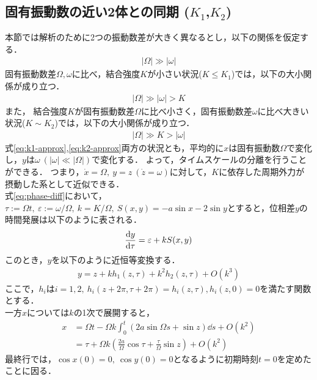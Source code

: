 \documentclass[../main]{subfiles}
\begin{document}
    \subsection{固有振動数の近い2体との同期 ($K_1$,$K_2$)}
    \label{sec:3body-k12}
    本節では解析のために2つの振動数差が大きく異なるとし，以下の関係を仮定する．
    \begin{align}
        \label{eq:assume}
        |\Omega|\gg|\omega|
    \end{align}
    固有振動数差$\Omega,\omega$に比べ，結合強度$K$が小さい状況($K\leq K_1$)では，以下の大小関係が成り立つ．
    \begin{align}
        \label{eq:k1-approx}
        |\Omega|\gg|\omega|>K
    \end{align}
    また，
    結合強度$K$が固有振動数差$\Omega$に比べ小さく，固有振動数差$\omega$に比べ大きい状況($K\sim K_2$)では，以下の大小関係が成り立つ．
    \begin{align}
        \label{eq:k2-approx}
        |\Omega|\gg K>|\omega|
    \end{align}
    式\eqref{eq:k1-approx},\eqref{eq:k2-approx}両方の状況とも，平均的に$x$は固有振動数$\Omega$で変化し，$y$は$\omega\ (|\omega|\ll|\Omega|)$で変化する．
    よって，タイムスケールの分離を行うことができる．
    つまり，$\dot{x}=\Omega,\ y=z\ (\dot{z}=\omega)$に対して，$K$に依存した周期外力が摂動した系として近似できる．\\
    式\eqref{eq:phase-diff}において，$\tau:=\Omega t,\ \varepsilon:=\omega/\Omega,\ k=K/\Omega,\ S(x,y)=-a\sin x-2\sin y$とすると，位相差$y$の時間発展は以下のように表される．
    \begin{align*}
        \dv{y}{\tau}=\varepsilon+k S(x,y) 
    \end{align*}
    このとき，$y$を以下のように近恒等変換する．
    \begin{align}
        y=z+kh_1(z,\tau)+k^2h_2(z,\tau)+O(k^3)
        \label{eq:pertu-ytilde}
    \end{align}
    ここで，$h_i$は$i=1,2,\ h_i(z+2\pi,\tau+2\pi)=h_i(z,\tau),h_i(z,0)=0$を満たす関数とする．\\
    一方$x$については$k$の1次で展開すると，
    \begin{align*}
        x&=\Omega t-\Omega k\int_0^t(2a\sin \Omega s+\sin z)\dd{s}+O(k^2)\\ 
        &=\tau+\Omega k\left(\frac{2a}{\Omega}\cos\tau+\frac{\tau}{\Omega}\sin z\right)+O(k^2)
    \end{align*}
    最終行では，$\cos x(0)=0,\ \cos y(0)=0$となるように初期時刻$t=0$を定めたことに因る．\\
\end{document}
